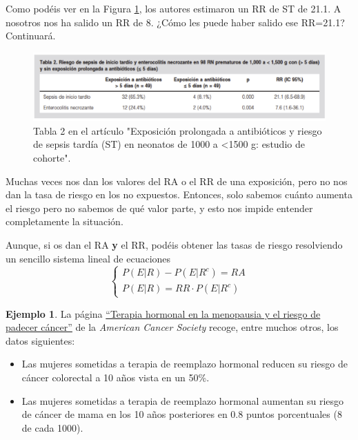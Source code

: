 \documentclass[
]{book}
\theoremstyle{definition}
\theoremstyle{definition}
\newtheorem{example}{Ejemplo}[chapter]
\theoremstyle{definition}
\theoremstyle{definition}
\theoremstyle{remark}
\begin{document}
\begin{rmdromans}
Como podéis ver en la Figura \ref{fig:tabla2ST}, los autores estimaron un RR de ST de 21.1. A nosotros nos ha salido un RR de 8. ¿Cómo les puede haber salido ese RR=21.1? Continuará.
\end{rmdromans}

\begin{figure}

{\centering \includegraphics[width=0.8\linewidth]{INREMDN_files/figure-html/sepsis} 

}

\caption{Tabla 2 en el artículo "Exposición prolongada a antibióticos y riesgo de sepsis tardía (ST) en neonatos de 1000 a <1500 g: estudio de cohorte".}\label{fig:tabla2ST}
\end{figure}

Muchas veces nos dan los valores del RA o el RR de una exposición, pero no nos dan la tasa de riesgo en los no expuestos. Entonces, solo sabemos cuánto aumenta el riesgo pero no sabemos de qué valor parte, y esto nos impide entender completamente la situación.

\begin{rmdnote}
Aunque, si os dan el RA \textbf{y} el RR, podéis obtener las tasas de riesgo resolviendo un sencillo sistema lineal de ecuaciones
\[
\left\{\begin{array}{l}
P(E|R)-P(E|R^c)=RA\\
P(E|R)=RR\cdot P(E|R^c)
\end{array}\right.
\]
\end{rmdnote}

\begin{example}
\protect\hypertarget{exm:unnamed-chunk-186}{}\label{exm:unnamed-chunk-186}La página \href{https://www.cancer.org/es/cancer/causas-del-cancer/tratamientos-medicos/terapia-de-restitucion-de-hormonas-en-la-menopausia-y-el-riesgo-de-cancer.html}{``Terapia hormonal en la menopausia y el riesgo de padecer cáncer''} de la \emph{American Cancer Society} recoge, entre muchos otros, los datos siguientes:
\end{example}

\begin{itemize}
\item
  Las mujeres sometidas a terapia de reemplazo hormonal reducen su riesgo de cáncer colorectal a 10 años vista en un 50\%.
\item
  Las mujeres sometidas a terapia de reemplazo hormonal aumentan su riesgo de cáncer de mama en los 10 años posteriores en 0.8 puntos porcentuales (8 de cada 1000).
\end{itemize}
\end{document}
